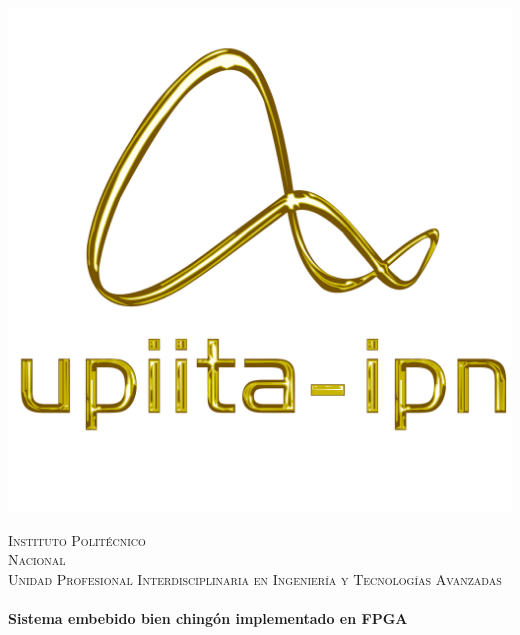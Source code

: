 \begin{center}
\begin{minipage}{0.48\textwidth}
\begin{flushright}
\includegraphics[scale = 0.3]{images/logo_upiita_oro.png}
\end{flushright}\end{minipage}


\vspace*{-2.5cm}  %

\textsc{\Huge Instituto Polit\'ecnico\\ \vspace{10pt} Nacional}\\[1.5cm]

\textsc{\huge Unidad Profesional Interdisciplinaria en Ingenier\'ia \vspace{5pt} y Tecnolog\'ias Avanzadas}\\[1.5cm]


\HRule \\[0.4cm]
{ \huge \bfseries Sistema embebido bien ching\'on implementado en FPGA}\\[0.4cm]
\HRule \\[1.5cm]


\end{center}
